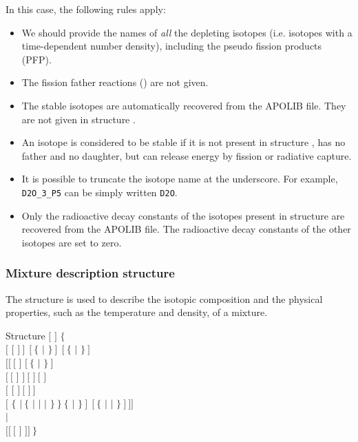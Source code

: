 \vskip 0.15cm

In this case, the following rules apply:
\begin{itemize}
\item We should provide the names  of {\sl all} the depleting
isotopes (i.e. isotopes with a time-dependent number density), including the
pseudo fission products (PFP).
\item The fission father reactions () are not given.
\item The stable isotopes are automatically recovered from the
APOLIB file. They are not given in structure .
\item An isotope is considered to be stable if it is not present in
structure , has no father and no daughter,
but can release energy by fission or radiative capture.
\item It is possible to truncate the isotope name  at the
underscore. For example, {\tt D2O\_3\_P5} can be simply written {\tt D2O}.
\item Only the radioactive decay constants of the isotopes present in
structure  are recovered from the APOLIB file. The
radioactive decay constants of the other isotopes are set to zero.
\end{itemize}

\subsubsection{Mixture description structure}\label{sect:descmix1}

The structure  is used to describe the isotopic composition and
the physical properties, such as the temperature and density, of a mixture.

\begin{DataStructure}{Structure }
 $[$  $]$ $\{$ \\
\hskip 1.0cm $[$ $[$  $]~]~~[~\{$  $|$  $\}~]~~[~\{$ 
    $|$ $\}~]$\\
\hskip 2.0cm $[[~[$  \moc{=} $]$   $[~\{$  
    $|$  $\}~]$\\
\hskip 2.0cm $[~[$  $]$  $]~[$   $]~[$   $]$ \\
\hskip 2.0cm $[$    $[$   $]~[$  $]~]$ \\
\hskip 2.0cm $[$  $\{$  $|~\{$  $|$  $|$  $|$  $\}~\}~\{$
 $|$  $\}~]~~[~\{$  $|$  $|$  $\}~]~]]$ \\
\hskip 1.0cm $|$ \\
\hskip 1.0cm  $[[~[$   $]$   $]]~\}$
\end{DataStructure}

